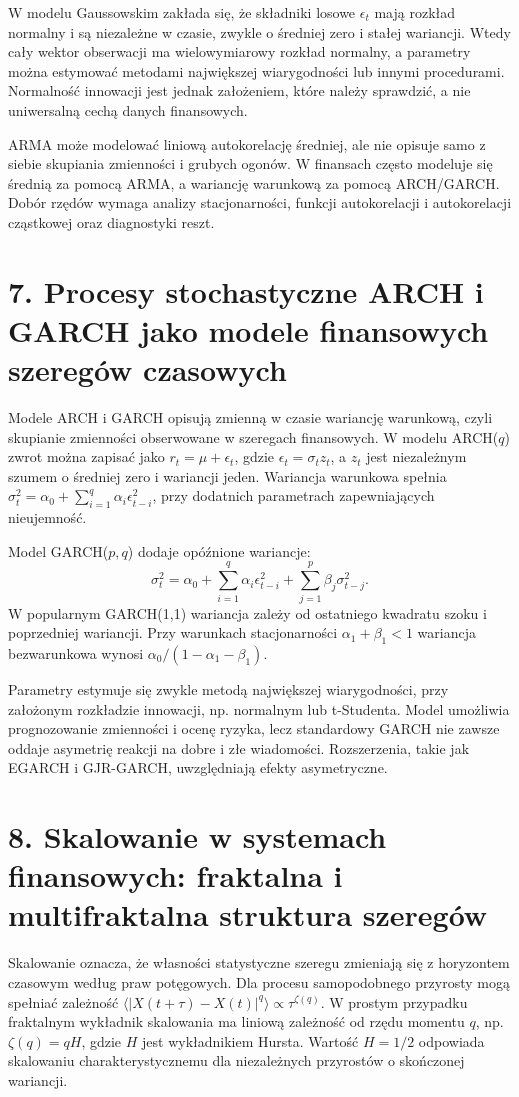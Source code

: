 \documentclass[11pt,a4paper,oneside]{report}
\begin{document}
W modelu Gaussowskim zakłada się, że składniki losowe \(\epsilon_t\) mają rozkład normalny i są niezależne w czasie, zwykle o średniej zero i stałej wariancji. Wtedy cały wektor obserwacji ma wielowymiarowy rozkład normalny, a parametry można estymować metodami największej wiarygodności lub innymi procedurami. Normalność innowacji jest jednak założeniem, które należy sprawdzić, a nie uniwersalną cechą danych finansowych.

ARMA może modelować liniową autokorelację średniej, ale nie opisuje samo z siebie skupiania zmienności i grubych ogonów. W finansach często modeluje się średnią za pomocą ARMA, a wariancję warunkową za pomocą ARCH/GARCH. Dobór rzędów wymaga analizy stacjonarności, funkcji autokorelacji i autokorelacji cząstkowej oraz diagnostyki reszt.

\section{7. Procesy stochastyczne ARCH i GARCH jako modele finansowych szeregów czasowych}
Modele ARCH i GARCH opisują zmienną w czasie wariancję warunkową, czyli skupianie zmienności obserwowane w szeregach finansowych. W modelu ARCH(\(q\)) zwrot można zapisać jako \(r_t=\mu+\epsilon_t\), gdzie \(\epsilon_t=\sigma_t z_t\), a \(z_t\) jest niezależnym szumem o średniej zero i wariancji jeden. Wariancja warunkowa spełnia \(\sigma_t^2=\alpha_0+\sum_{i=1}^q\alpha_i\epsilon_{t-i}^2\), przy dodatnich parametrach zapewniających nieujemność.

Model GARCH(\(p,q\)) dodaje opóźnione wariancje:
\[
\sigma_t^2=\alpha_0+\sum_{i=1}^q\alpha_i\epsilon_{t-i}^2+
\sum_{j=1}^p\beta_j\sigma_{t-j}^2.
\]
W popularnym GARCH(1,1) wariancja zależy od ostatniego kwadratu szoku i poprzedniej wariancji. Przy warunkach stacjonarności \(\alpha_1+\beta_1<1\) wariancja bezwarunkowa wynosi \(\alpha_0/(1-\alpha_1-\beta_1)\).

Parametry estymuje się zwykle metodą największej wiarygodności, przy założonym rozkładzie innowacji, np. normalnym lub t-Studenta. Model umożliwia prognozowanie zmienności i ocenę ryzyka, lecz standardowy GARCH nie zawsze oddaje asymetrię reakcji na dobre i złe wiadomości. Rozszerzenia, takie jak EGARCH i GJR-GARCH, uwzględniają efekty asymetryczne.

\section{8. Skalowanie w systemach finansowych: fraktalna i multifraktalna struktura szeregów}
Skalowanie oznacza, że własności statystyczne szeregu zmieniają się z horyzontem czasowym według praw potęgowych. Dla procesu samopodobnego przyrosty mogą spełniać zależność \(\langle|X(t+\tau)-X(t)|^q\rangle\propto\tau^{\zeta(q)}\). W prostym przypadku fraktalnym wykładnik skalowania ma liniową zależność od rzędu momentu \(q\), np. \(\zeta(q)=qH\), gdzie \(H\) jest wykładnikiem Hursta. Wartość \(H=1/2\) odpowiada skalowaniu charakterystycznemu dla niezależnych przyrostów o skończonej wariancji.
\end{document}
